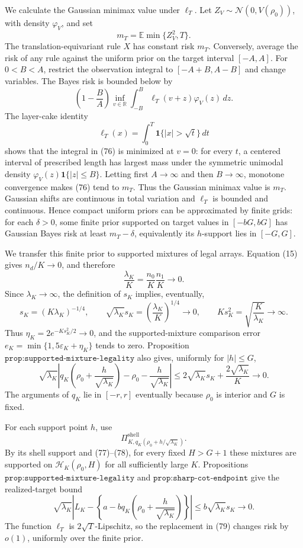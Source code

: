 We calculate the Gaussian minimax value under \(\ell_T\).  Let
\(Z_V\sim\mathcal N(0,V(\rho_0))\), with density \(\varphi_V\), and set
\[
 m_T=\mathbb E\min\{Z_V^2,T\}.
\]
The translation-equivariant rule \(X\) has constant risk \(m_T\).
Conversely, average the risk of any rule against the uniform prior on
the target interval \([-A,A]\).  For \(0<B<A\), restrict the
observation integral to \([-A+B,A-B]\) and change variables.  The Bayes
risk is bounded below by
\[
 \left(1-\frac BA\right)
 \inf_{v\in\mathbb R}
 \int_{-B}^{B}\ell_T(v+z)\varphi_V(z)\,dz.
 \tag{76}
\]
The layer-cake identity
\[
 \ell_T(x)=\int_0^T\mathbf 1\{|x|>\sqrt t\}\,dt
\]
shows that the integral in (76) is minimized at \(v=0\): for every
\(t\), a centered interval of prescribed length has largest mass under
the symmetric unimodal density
\(\varphi_V(z)\mathbf 1\{|z|\le B\}\).  Letting first \(A\to\infty\)
and then \(B\to\infty\), monotone convergence makes (76) tend to
\(m_T\).  Thus the Gaussian minimax value is \(m_T\).  Gaussian shifts
are continuous in total variation and \(\ell_T\) is bounded and
continuous.  Hence compact uniform priors can be approximated by finite
grids: for each \(\delta>0\), some finite prior supported on target
values in \([-bG,bG]\) has Gaussian Bayes risk at least
\(m_T-\delta\), equivalently its \(h\)-support lies in \([-G,G]\).

We transfer this finite prior to supported mixtures of legal arrays.
Equation (15) gives \(n_d/K\to0\), and therefore
\[
 \frac{\lambda_K}{K}
 =\frac{n_0}{K}\frac{n_1}{K}\longrightarrow0.
\]
Since \(\lambda_K\to\infty\), the definition of \(s_K\) implies,
eventually,
\[
 s_K=(K\lambda_K)^{-1/4},\qquad
 \sqrt{\lambda_K}s_K
 =\left(\frac{\lambda_K}{K}\right)^{1/4}\to0,
 \qquad
 Ks_K^2=\sqrt{\frac K{\lambda_K}}\to\infty.
 \tag{77}
\]
Thus \(\eta_K=2e^{-Ks_K^2/2}\to0\), and the supported-mixture
comparison error
\(e_K=\min\{1,5\varepsilon_K+\eta_K\}\) tends to zero.  Proposition
\(\texttt{prop:supported-mixture-legality}\) also gives, uniformly for
\(|h|\le G\),
\[
 \sqrt{\lambda_K}\left|
 q_K\left(\rho_0+\frac h{\sqrt{\lambda_K}}\right)
 -\rho_0-\frac h{\sqrt{\lambda_K}}
 \right|
 \le2\sqrt{\lambda_K}s_K+\frac{2\sqrt{\lambda_K}}K
 \longrightarrow0.
 \tag{78}
\]
The arguments of \(q_K\) lie in \([-r,r]\) eventually because
\(\rho_0\) is interior and \(G\) is fixed.

For each support point \(h\), use
\[
 \Pi_{K,q_K(\rho_0+h/\sqrt{\lambda_K})}^{\mathrm{shell}}.
\]
By its shell support and (77)--(78), for every fixed \(H>G+1\) these
mixtures are supported on
\(\mathcal H_K(\rho_0,H)\) for all sufficiently large \(K\).
Propositions \(\texttt{prop:supported-mixture-legality}\) and
\(\texttt{prop:sharp-cot-endpoint}\) give the realized-target bound
\[
 \sqrt{\lambda_K}\left|
 L_K-
 \left\{a-bq_K\left(\rho_0+
 \frac h{\sqrt{\lambda_K}}\right)\right\}\right|
 \le b\sqrt{\lambda_K}s_K\longrightarrow0.
 \tag{79}
\]
The function \(\ell_T\) is \(2\sqrt T\)-Lipschitz, so the replacement
in (79) changes risk by \(o(1)\), uniformly over the finite prior.

